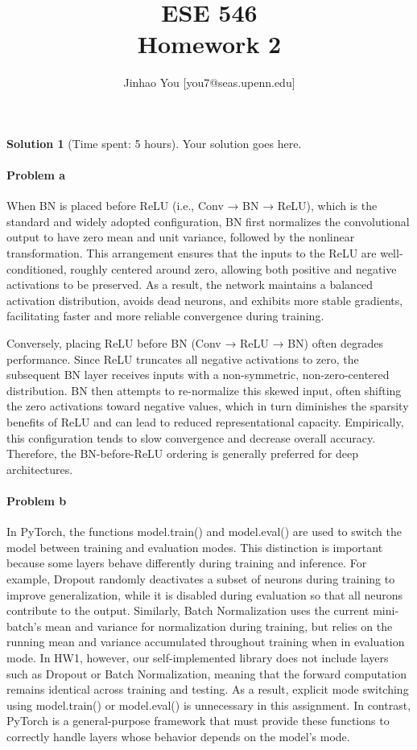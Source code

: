 \documentclass[11pt, reqno, letterpaper, twoside]{amsart}
\title{ESE 546\\[0.1in]
Homework 2}
\author{
Jinhao You [you7@seas.upenn.edu]
}
\theoremstyle{plain}
\theoremstyle{definition}
\newtheorem{solution}[theorem]{Solution}
\begin{document}
\maketitle

\begin{solution}[Time spent: 5 hours]
Your solution goes here.\\

\paragraph{\textbf{Problem a}} When BN is placed before ReLU (i.e., Conv → BN → ReLU), which is the standard and widely adopted configuration, BN first normalizes the convolutional output to have zero mean and unit variance, followed by the nonlinear transformation. This arrangement ensures that the inputs to the ReLU are well-conditioned, roughly centered around zero, allowing both positive and negative activations to be preserved. As a result, the network maintains a balanced activation distribution, avoids dead neurons, and exhibits more stable gradients, facilitating faster and more reliable convergence during training.

Conversely, placing ReLU before BN (Conv → ReLU → BN) often degrades performance. Since ReLU truncates all negative activations to zero, the subsequent BN layer receives inputs with a non-symmetric, non-zero-centered distribution. BN then attempts to re-normalize this skewed input, often shifting the zero activations toward negative values, which in turn diminishes the sparsity benefits of ReLU and can lead to reduced representational capacity. Empirically, this configuration tends to slow convergence and decrease overall accuracy. Therefore, the BN-before-ReLU ordering is generally preferred for deep architectures.\\

\paragraph{\textbf{Problem b}} In PyTorch, the functions model.train() and model.eval() are used to switch the model between training and evaluation modes. This distinction is important because some layers behave differently during training and inference. For example, Dropout randomly deactivates a subset of neurons during training to improve generalization, while it is disabled during evaluation so that all neurons contribute to the output. Similarly, Batch Normalization uses the current mini-batch's mean and variance for normalization during training, but relies on the running mean and variance accumulated throughout training when in evaluation mode. 
In HW1, however, our self-implemented library does not include layers such as Dropout or Batch Normalization, meaning that the forward computation remains identical across training and testing. As a result, explicit mode switching using model.train() or model.eval() is unnecessary in this assignment. In contrast, PyTorch is a general-purpose framework that must provide these functions to correctly handle layers whose behavior depends on the model's mode.\\


\end{solution}
\end{document}
